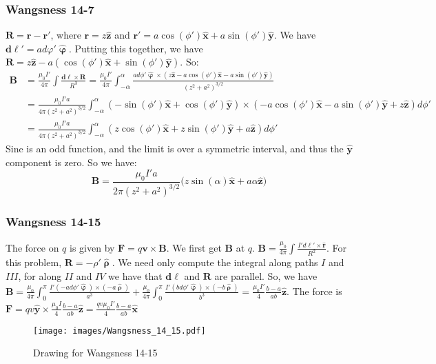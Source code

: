             \subsubsection{Wangsness 14-7}
            $\mathbf{R} = \mathbf{r}-\mathbf{r}'$, where $\mathbf{r} = z\hat{\mathbf{z}}$ and $\mathbf{r}' = a\cos(\phi')\hat{\mathbf{x}}+a\sin(\phi')\hat{\mathbf{y}}$. We have $\boldsymbol{d\ell}' = ad\varphi' \hat{\boldsymbol{\upvarphi}}$. Putting this together, we have $\mathbf{R} = z\hat{\mathbf{z}} - a(\cos(\phi')\hat{\mathbf{x}}+\sin(\phi')\hat{\mathbf{y}})$. So:
            \begin{align*}
                \mathbf{B} &= \frac{\mu_0 I'}{4\pi}\int \frac{\boldsymbol{d\ell}\times \mathbf{R}}{R^3} = \frac{\mu_0I'}{4\pi} \int_{-\alpha}^{\alpha} \frac{ad\phi' \hat{\boldsymbol{\upvarphi}}\times (z\hat{\mathbf{z}}-a\cos(\phi')\hat{\mathbf{x}}-a\sin(\phi')\hat{\mathbf{y}})}{(z^2+a^2)^{3/2}}\\
                &= \frac{\mu_0 I'a}{4\pi(z^2+a^2)^{3/2}}\int_{-\alpha}^{\alpha} (-\sin(\phi')\hat{\mathbf{x}}+\cos(\phi')\hat{\mathbf{y}})\times (-a\cos(\phi')\hat{\mathbf{x}}-a\sin(\phi')\hat{\mathbf{y}}+z\hat{\mathbf{z}})d\phi'\\
                &= \frac{\mu_0 I'a}{4\pi (z^2+a^2)^{3/2}}\int_{-\alpha}^{\alpha} (z\cos(\phi')\hat{\mathbf{x}}+z\sin(\phi')\hat{\mathbf{y}}+a\hat{\mathbf{z}})d\phi'
            \end{align*}
            Sine is an odd function, and the limit is over a symmetric interval, and thus the $\hat{\mathbf{y}}$ component is zero. So we have:
            \begin{equation*}
                \mathbf{B} = \frac{\mu_0 I' a}{2\pi (z^2+a^2)^{3/2}}\big(z\sin(\alpha)\hat{\mathbf{x}}+a\alpha \hat{\mathbf{z}}\big)    
            \end{equation*}
            \subsubsection{Wangsness 14-15}
            The force on $q$ is given by $\mathbf{F} = q\mathbf{v}\times \mathbf{B}$. We first get $\mathbf{B}$ at $q$. $\mathbf{B} = \frac{\mu_0}{4\pi} \int \frac{I' d\ell' \times \hat{\mathbf{r}}}{R^2}$. For this problem, $\mathbf{R} = -\rho' \hat{\boldsymbol{\uprho}}$. We need only compute the integral along paths $I$ and $III$, for along $II$ and $IV$ we have that $\mathbf{d\ell}$ and $\mathbf{R}$ are parallel. So, we have $\mathbf{B} = \frac{\mu_0}{4\pi} \int_{0}^{\pi} \frac{I'(-ad\phi' \hat{\boldsymbol{\upvarphi}})\times (-a\hat{\boldsymbol{\uprho}})}{a^3}+ \frac{\mu_0}{4\pi} \int_{0}^{\pi} \frac{I'(bd\phi' \hat{\boldsymbol{\upvarphi}})\times (-b\hat{\boldsymbol{\uprho}})}{b^3} = \frac{\mu_0 I'}{4} \frac{b-a}{ab} \hat{\mathbf{z}}$. The force is $\mathbf{F} = qv\hat{\mathbf{y}} \times \frac{\mu_0 I}{4} \frac{b-a}{ab} \hat{\mathbf{z}} = \frac{qv\mu_0 I'}{4} \frac{b-a}{ab} \hat{\mathbf{x}}$
            \begin{figure}[htbp]
                \centering
                \captionsetup{type=figure}
                \texttt{[image: images/Wangsness\_14\_15.pdf]}
                \caption{Drawing for Wangsness 14-15}
            \end{figure}
